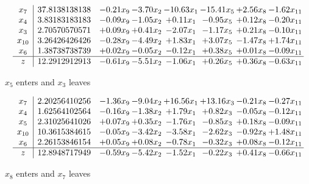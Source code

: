 \documentclass[8pt]{article}
\begin{document}
 \[\begin{array}{c| c c@{\hskip 2pt} c@{\hskip 2pt} c@{\hskip 2pt} c@{\hskip 2pt} c@{\hskip 2pt} c@{\hskip 2pt} }
 x_{7}   &  37.8138138138 & -0.21 x_{9} & -3.70 x_{2} & -10.63 x_{1} & -15.41 x_{5} & +  2.56 x_{8} & -1.62 x_{11}\\
 x_{4}   &  3.83183183183 & -0.09 x_{9} & -1.05 x_{2} & +  0.11 x_{1} & -0.95 x_{5} & +  0.12 x_{8} & -0.20 x_{11}\\
 x_{3}   &  2.70570570571 & +  0.09 x_{9} & +  0.41 x_{2} & -2.07 x_{1} & -1.17 x_{5} & +  0.21 x_{8} & -0.10 x_{11}\\
 x_{10}   &  3.26426426426 & -0.28 x_{9} & -4.49 x_{2} & +  1.83 x_{1} & +  3.07 x_{5} & -1.47 x_{8} & +  1.74 x_{11}\\
 x_{6}   &  1.38738738739 & +  0.02 x_{9} & -0.05 x_{2} & -0.12 x_{1} & +  0.38 x_{5} & +  0.01 x_{8} & -0.09 x_{11}\\
\hline
z    &  12.2912912913 & -0.61 x_{9} & -5.51 x_{2} & -1.06 x_{1} & +  0.26 x_{5} & +  0.36 x_{8} & -0.63 x_{11}\\
\end{array}\]


 $ x_{5} $ enters and $ x_{3} $ leaves 

 \[\begin{array}{c| c c@{\hskip 2pt} c@{\hskip 2pt} c@{\hskip 2pt} c@{\hskip 2pt} c@{\hskip 2pt} c@{\hskip 2pt} }
 x_{7}   &  2.20256410256 & -1.36 x_{9} & -9.04 x_{2} & + 16.56 x_{1} & + 13.16 x_{3} & -0.21 x_{8} & -0.27 x_{11}\\
 x_{4}   &  1.62564102564 & -0.16 x_{9} & -1.38 x_{2} & +  1.79 x_{1} & +  0.82 x_{3} & -0.05 x_{8} & -0.12 x_{11}\\
 x_{5}   &  2.31025641026 & +  0.07 x_{9} & +  0.35 x_{2} & -1.76 x_{1} & -0.85 x_{3} & +  0.18 x_{8} & -0.09 x_{11}\\
 x_{10}   &  10.3615384615 & -0.05 x_{9} & -3.42 x_{2} & -3.58 x_{1} & -2.62 x_{3} & -0.92 x_{8} & +  1.48 x_{11}\\
 x_{6}   &  2.26153846154 & +  0.05 x_{9} & +  0.08 x_{2} & -0.78 x_{1} & -0.32 x_{3} & +  0.08 x_{8} & -0.12 x_{11}\\
\hline
z    &  12.8948717949 & -0.59 x_{9} & -5.42 x_{2} & -1.52 x_{1} & -0.22 x_{3} & +  0.41 x_{8} & -0.66 x_{11}\\
\end{array}\]


 $ x_{8} $ enters and $ x_{7} $ leaves 
\end{document}
